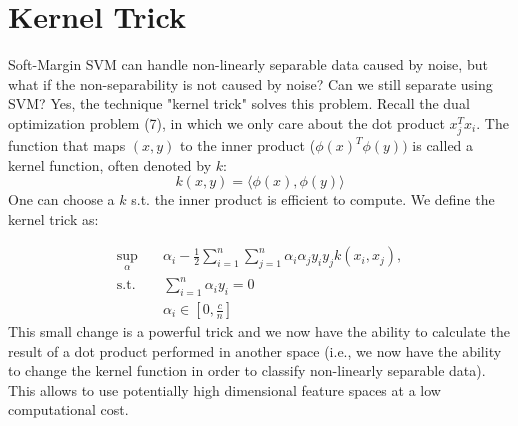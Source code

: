 \documentclass[12pt]{article}
\begin{document}
\section{Kernel Trick}
Soft-Margin SVM can handle non-linearly separable data caused by noise, but what if the non-separability is not caused by noise? Can we still separate using SVM? Yes, the technique "kernel trick" solves this problem. Recall the dual optimization problem (7), in which we only care about the dot product $x_j^{T}x_i$. The function that maps $(x,y)$ to the inner product ($\phi(x)^{T}\phi(y))$ is called a kernel function, often denoted by $k$:
$$k(x,y) = \langle \phi(x), \phi(y) \rangle$$
One can choose a $k$ s.t. the inner product is efficient to compute. We define the kernel trick as:

\begin{equation}
    \begin{aligned}
    \underset{\alpha}{\text{sup}} \quad & \alpha_{i} - \frac{1}{2} \sum_{i=1}^{n} \sum_{j=1}^{n} \alpha_{i}\alpha_{j}y_{i}y_{j}k(x_i,x_j),\\
    \textrm{s.t.} \quad & \sum_{i=1}^{n} \alpha_{i}y_{i} = 0  \\
    & \alpha_{i} \in [0,\frac{c}{n}]
    \end{aligned}
    \end{equation}
This small change is a powerful trick and we now have the ability to calculate the result of a dot product performed in another space (i.e., we now have the ability to change the kernel function in order to classify non-linearly separable data). This allows to use potentially high dimensional feature spaces at a low computational cost.
\end{document}
